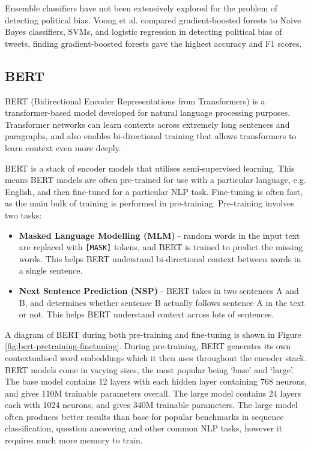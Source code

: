 Ensemble classifiers have not been extensively explored for the problem of detecting political bias. Voong et al. \cite{voong} compared gradient-boosted forests to Naive Bayes classifiers, SVMs, and logistic regression in detecting political bias of tweets, finding gradient-boosted forests gave the highest accuracy and F1 scores.

\subsection{BERT}

BERT (Bidirectional Encoder Representations from Transformers) \cite{bert} is a transformer-based model developed for natural language processing purposes. Transformer networks can learn contexts across extremely long sentences and paragraphs, and also enables bi-directional training that allows transformers to learn context even more deeply.

BERT is a stack of encoder models that utilises semi-supervised learning. This means BERT models are often pre-trained for use with a particular language, e.g. English, and then fine-tuned for a particular NLP task. Fine-tuning is often fast, as the main bulk of training is performed in pre-training. Pre-training involves two tasks:
\begin{itemize}
    \item \textbf{Masked Language Modelling (MLM)} - random words in the input text are replaced with \texttt{[MASK]} tokens, and BERT is trained to predict the missing words. This helps BERT understand bi-directional context between words in a single sentence.
    \item \textbf{Next Sentence Prediction (NSP)} - BERT takes in two sentences A and B, and determines whether sentence B actually follows sentence A in the text or not. This helps BERT understand context across lots of sentences.
\end{itemize}

A diagram of BERT during both pre-training and fine-tuning is shown in Figure \ref{fig:bert-pretraining-finetuning}. During pre-training, BERT generates its own contextualised word embeddings which it then uses throughout the encoder stack. BERT models come in varying sizes, the most popular being `base' and `large'. The base model contains 12 layers with each hidden layer containing 768 neurons, and gives 110M trainable parameters overall. The large model contains 24 layers each with 1024 neurons, and gives 340M trainable parameters. The large model often produces better results than base for popular benchmarks in sequence classification, question answering and other common NLP tasks, however it requires much more memory to train.

